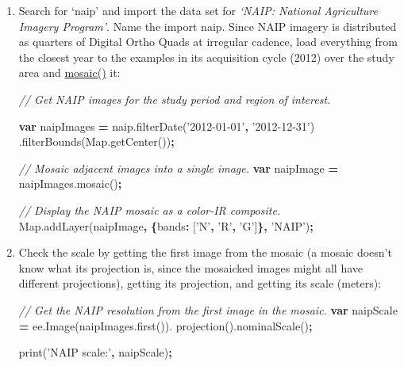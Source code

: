 \documentclass[
]{article}
\newenvironment{Shaded}{\begin{snugshade}}{\end{snugshade}}
\newcommand{\AttributeTok}[1]{\textcolor[rgb]{0.77,0.63,0.00}{#1}}
\newcommand{\CommentTok}[1]{\textcolor[rgb]{0.56,0.35,0.01}{\textit{#1}}}
\newcommand{\DataTypeTok}[1]{\textcolor[rgb]{0.13,0.29,0.53}{#1}}
\newcommand{\KeywordTok}[1]{\textcolor[rgb]{0.13,0.29,0.53}{\textbf{#1}}}
\newcommand{\NormalTok}[1]{#1}
\newcommand{\OperatorTok}[1]{\textcolor[rgb]{0.81,0.36,0.00}{\textbf{#1}}}
\newcommand{\StringTok}[1]{\textcolor[rgb]{0.31,0.60,0.02}{#1}}
\newcommand{\VariableTok}[1]{\textcolor[rgb]{0.00,0.00,0.00}{#1}}
\begin{document}
\begin{enumerate}
\def\labelenumi{\arabic{enumi}.}
\item
  Search for `naip' and import the data set for \emph{`NAIP: National Agriculture Imagery Program'}. Name the import naip. Since NAIP imagery is distributed as quarters of Digital Ortho Quads at irregular cadence, load everything from the closest year to the examples in its acquisition cycle (2012) over the study area and \href{https://developers.google.com/earth-engine/guides/ic_composite_mosaic}{mosaic()} it:

\begin{Shaded}
\begin{Highlighting}[]
\CommentTok{// Get NAIP images for the study period and region of interest.}

\KeywordTok{var}\NormalTok{ naipImages }\OperatorTok{=} \VariableTok{naip}\NormalTok{.}\AttributeTok{filterDate}\NormalTok{(}\StringTok{'2012-01-01'}\OperatorTok{,} \StringTok{'2012-12-31'}\NormalTok{)}
\NormalTok{.}\AttributeTok{filterBounds}\NormalTok{(}\VariableTok{Map}\NormalTok{.}\AttributeTok{getCenter}\NormalTok{())}\OperatorTok{;}

\CommentTok{// Mosaic adjacent images into a single image.}
\KeywordTok{var}\NormalTok{ naipImage }\OperatorTok{=} \VariableTok{naipImages}\NormalTok{.}\AttributeTok{mosaic}\NormalTok{()}\OperatorTok{;}

\CommentTok{// Display the NAIP mosaic as a color-IR composite.}
\VariableTok{Map}\NormalTok{.}\AttributeTok{addLayer}\NormalTok{(naipImage}\OperatorTok{,} \OperatorTok{\{}\DataTypeTok{bands}\OperatorTok{:}\NormalTok{ [}\StringTok{'N'}\OperatorTok{,} \StringTok{'R'}\OperatorTok{,} \StringTok{'G'}\NormalTok{]}\OperatorTok{\},} \StringTok{'NAIP'}\NormalTok{)}\OperatorTok{;}
\end{Highlighting}
\end{Shaded}
\item
  Check the scale by getting the first image from the mosaic (a mosaic doesn't know what its projection is, since the mosaicked images might all have different projections), getting its projection, and getting its scale (meters):

\begin{Shaded}
\begin{Highlighting}[]
\CommentTok{// Get the NAIP resolution from the first image in the mosaic.}
\KeywordTok{var}\NormalTok{ naipScale }\OperatorTok{=} \VariableTok{ee}\NormalTok{.}\AttributeTok{Image}\NormalTok{(}\VariableTok{naipImages}\NormalTok{.}\AttributeTok{first}\NormalTok{()).}
              \AttributeTok{projection}\NormalTok{().}\AttributeTok{nominalScale}\NormalTok{()}\OperatorTok{;}

\AttributeTok{print}\NormalTok{(}\StringTok{'NAIP scale:'}\OperatorTok{,}\NormalTok{ naipScale)}\OperatorTok{;}
\end{Highlighting}
\end{Shaded}
\end{enumerate}
\end{document}
